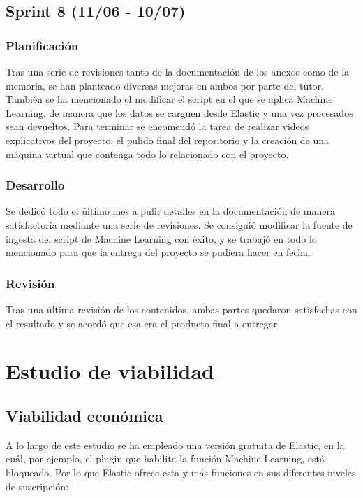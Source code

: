 \subsection{Sprint 8 (11/06 - 10/07)}
\subsubsection{Planificación}
Tras una serie de revisiones tanto de la documentación de los anexos como de la memoria, se han planteado diversas mejoras en ambos por parte del tutor. También se ha mencionado el modificar el script en el que se aplica Machine Learning, de manera que los datos se carguen desde Elastic y una vez procesados sean devueltos. Para terminar se encomendó la tarea de realizar videos explicativos del proyecto, el pulido final del repositorio y la creación de una máquina virtual que contenga todo lo relacionado con el proyecto.

\subsubsection{Desarrollo}
Se dedicó todo el último mes a pulir detalles en la documentación de manera satisfactoria mediante una serie de revisiones. Se consiguió modificar la fuente de ingesta del script de Machine Learning con éxito, y se trabajó en todo lo mencionado para que la entrega del proyecto se pudiera hacer en fecha.

\subsubsection{Revisión}
Tras una última revisión de los contenidos, ambas partes quedaron satisfechas con el resultado y se acordó que esa era el producto final a entregar.

\section{Estudio de viabilidad}

\subsection{Viabilidad económica}
A lo largo de este estudio se ha empleado una versión gratuita de Elastic, en la cuál, por ejemplo, el plugin que habilita la función Machine Learning, está bloqueado. Por lo que Elastic ofrece esta y más funciones en sus diferentes niveles de suscripción:

